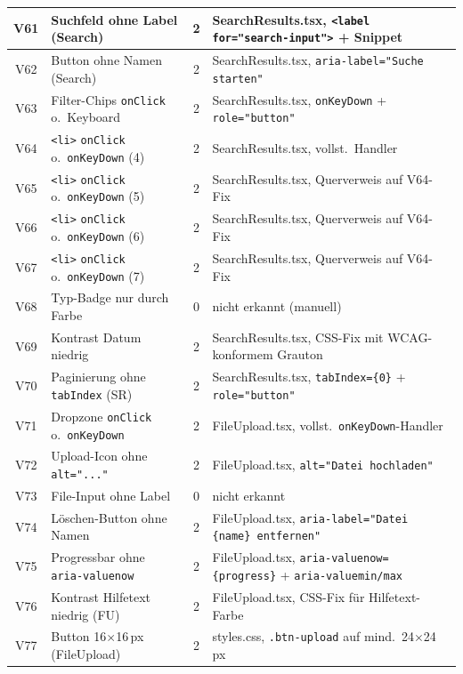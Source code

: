 \begin{longtable}{|c|p{5.0cm}|c|p{5.4cm}|}
V61  & Suchfeld ohne Label (Search)                 & 2 & SearchResults.tsx, \texttt{<label for="search-input">} + Snippet \\ \hline
V62  & Button ohne Namen (Search)                   & 2 & SearchResults.tsx, \texttt{aria-label="Suche starten"} \\ \hline
V63  & Filter-Chips \texttt{onClick} o.\ Keyboard   & 2 & SearchResults.tsx, \texttt{onKeyDown} + \texttt{role="button"} \\ \hline
V64  & \texttt{<li>} \texttt{onClick} o.\ \texttt{onKeyDown} (4) & 2 & SearchResults.tsx, vollst.\ Handler \\ \hline
V65  & \texttt{<li>} \texttt{onClick} o.\ \texttt{onKeyDown} (5) & 2 & SearchResults.tsx, Querverweis auf V64-Fix \\ \hline
V66  & \texttt{<li>} \texttt{onClick} o.\ \texttt{onKeyDown} (6) & 2 & SearchResults.tsx, Querverweis auf V64-Fix \\ \hline
V67  & \texttt{<li>} \texttt{onClick} o.\ \texttt{onKeyDown} (7) & 2 & SearchResults.tsx, Querverweis auf V64-Fix \\ \hline
V68  & Typ-Badge nur durch Farbe                    & 0 & nicht erkannt (manuell) \\ \hline
V69  & Kontrast Datum niedrig                       & 2 & SearchResults.tsx, \ac{CSS}-Fix mit \ac{WCAG}-konformem Grauton \\ \hline
V70  & Paginierung ohne \texttt{tabIndex} (SR)      & 2 & SearchResults.tsx, \texttt{tabIndex=\{0\}} + \texttt{role="button"} \\ \hline
V71  & Dropzone \texttt{onClick} o.\ \texttt{onKeyDown} & 2 & FileUpload.tsx, vollst.\ \texttt{onKeyDown}-Handler \\ \hline
V72  & Upload-Icon ohne \texttt{alt="..."}                & 2 & FileUpload.tsx, \texttt{alt="Datei hochladen"} \\ \hline
V73  & File-Input ohne Label                        & 0 & nicht erkannt \\ \hline
V74  & Löschen-Button ohne Namen                   & 2 & FileUpload.tsx, \texttt{aria-label="Datei \{name\} entfernen"} \\ \hline
V75  & Progressbar ohne \texttt{aria-valuenow}      & 2 & FileUpload.tsx, \texttt{aria-valuenow=\{progress\}} + \texttt{aria-valuemin/max} \\ \hline
V76  & Kontrast Hilfetext niedrig (FU)              & 2 & FileUpload.tsx, \ac{CSS}-Fix für Hilfetext-Farbe \\ \hline
V77  & Button 16$\times$16\,px (FileUpload)         & 2 & styles.css, \texttt{.btn-upload} auf mind.\ 24$\times$24\,px \\ \hline

\end{longtable}
